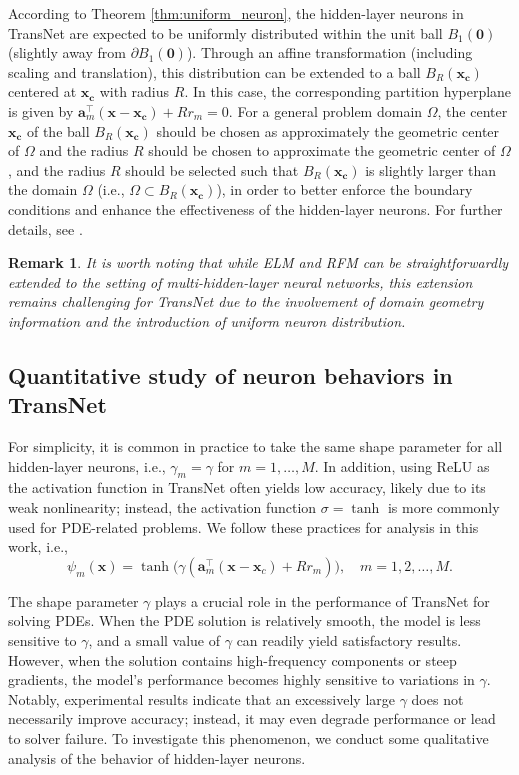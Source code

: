 \documentclass{article}
\newcommand{\bx}{\mathbf{x}}
\newtheorem{remark}{Remark}
\begin{document}
According to Theorem \ref{thm:uniform_neuron}, the hidden-layer neurons in TransNet are expected to be uniformly distributed within the unit ball $B_1(\mathbf{0})$ (slightly away from $\partial B_1(\mathbf{0})$).
Through an affine transformation (including scaling and translation), this distribution can be extended to a ball $B_R(\mathbf{x_c})$ centered at $\mathbf{x_c}$ with radius $R$.
In this case, the corresponding partition hyperplane is given by
$\mathbf{a}_m^\top (\mathbf{x - x_c}) + R r_m = 0.
$
For a general problem domain $\Omega$, the center $\mathbf{x_c}$ of the ball $B_R(\mathbf{x_c})$ should be chosen as approximately the geometric center of $\Omega$ and the radius $R$ should be chosen to approximate the geometric center of $\Omega$, and the radius $R$ should be selected such that $B_R(\mathbf{x_c})$ is slightly larger than the domain $\Omega$
(i.e., $\Omega \subset B_R(\mathbf{x_c})$), in order to better enforce the boundary conditions and enhance the effectiveness of the hidden-layer neurons.
For further details, see \cite{Lu25}.

\begin{remark}
It is worth noting that while ELM and RFM can be straightforwardly extended to the setting of multi-hidden-layer neural networks, this extension remains challenging for TransNet due to the involvement of domain geometry information and the introduction of uniform neuron distribution.
\end{remark}

\subsection{Quantitative study of neuron behaviors in TransNet}

For simplicity, it is common in practice to take the same shape parameter for all hidden-layer neurons, i.e., $\gamma_m = \gamma$ for $m = 1,\ldots,M$. In addition, using ReLU as the activation function in TransNet often yields low accuracy, likely due to its weak nonlinearity; instead, the activation function $\sigma = \tanh$ is more commonly used for PDE-related problems. We follow these practices for analysis in this work, i.e.,
\begin{equation}\label{ssp}
\psi_m(\bx) = \tanh\big(\gamma (\mathbf{a}_m^\top (\bx-\bx_c) + Rr_m)\big),\quad m=1,2,\ldots,M.
\end{equation}

The shape parameter $\gamma$ plays a crucial role in the performance of TransNet for solving PDEs. When the PDE solution is relatively smooth, the model is less sensitive to $\gamma$, and a small value of $\gamma$ can readily yield satisfactory results. However, when the solution contains high-frequency components or steep gradients, the model’s performance becomes highly sensitive to variations in $\gamma$. Notably, experimental results indicate that an excessively large $\gamma$ does not necessarily improve accuracy; instead, it may even degrade performance or lead to solver failure. To investigate this phenomenon, we conduct some qualitative analysis of the behavior of hidden-layer neurons.
\end{document}
